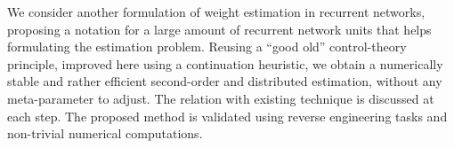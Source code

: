 We consider another formulation of weight estimation in recurrent networks, proposing a notation for a large amount of recurrent network units that helps formulating the estimation problem. Reusing a ``good old'' control-theory principle, improved here using a continuation heuristic, we obtain a numerically stable and rather efficient second-order and distributed estimation, without any meta-parameter to adjust. The relation with existing technique is discussed at each step. 
The proposed method is validated using reverse engineering tasks and non-trivial numerical computations.

